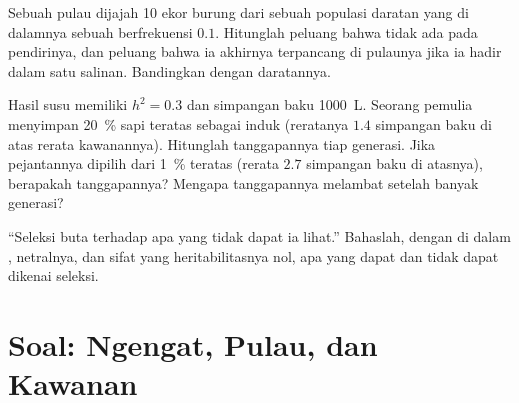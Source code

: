 \begin{exercise}[$\star\star\star$]\label{exo:b2:population-genetics:10}
Sebuah pulau dijajah 10 ekor burung dari sebuah populasi daratan yang
di dalamnya sebuah  berfrekuensi $0.1$. Hitunglah peluang bahwa
 tidak ada pada pendirinya, dan peluang bahwa ia akhirnya
terpancang di pulaunya jika ia hadir dalam satu salinan. Bandingkan
dengan daratannya.
\end{exercise}

\begin{exercise}[$\star\star\star$]\label{exo:b2:population-genetics:11}
Hasil susu memiliki $h^{2} = 0.3$ dan simpangan baku \qty{1000}{L}.
Seorang pemulia menyimpan \qty{20}{\%} sapi teratas sebagai induk
(reratanya $1.4$ simpangan baku di atas rerata kawanannya). Hitunglah
tanggapannya tiap generasi. Jika pejantannya dipilih dari \qty{1}{\%}
teratas (rerata $2.7$ simpangan baku di atasnya), berapakah
tanggapannya? Mengapa tanggapannya melambat setelah banyak generasi?
\end{exercise}

\begin{exercise}[$\star\star\star$]\label{exo:b2:population-genetics:12}
``Seleksi buta terhadap apa yang tidak dapat ia lihat.'' Bahaslah,
dengan   di dalam ,  netralnya, dan sifat
yang heritabilitasnya nol, apa yang dapat dan tidak dapat dikenai
seleksi.
\end{exercise}

\section{Soal: Ngengat, Pulau, dan Kawanan}

